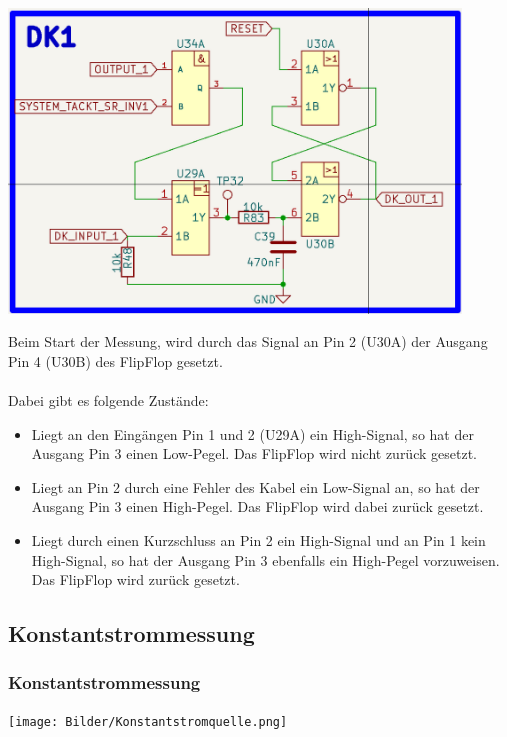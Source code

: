 \documentclass[a4paper,11pt]{scrartcl}
\begin{document}
\begin{center}
\includegraphics[width=12cm]{Bilder/Durchgangsprüfung.png}
\end{center}

Beim Start der Messung, wird durch das Signal an Pin 2 (U30A) der Ausgang Pin 4 (U30B) des FlipFlop gesetzt. 
\\
\\
Dabei gibt es folgende Zustände:

\begin{itemize}
	\item{Liegt an den Eingängen Pin 1 und 2 (U29A) ein High-Signal,  so hat der Ausgang Pin 3 einen Low-Pegel. Das FlipFlop wird nicht zurück gesetzt.}
	
	\item{Liegt an Pin 2 durch eine Fehler des Kabel ein Low-Signal an, so hat der Ausgang Pin 3 einen High-Pegel. Das FlipFlop wird dabei zurück gesetzt.}
	
	\item{Liegt durch einen Kurzschluss an Pin 2 ein High-Signal und an Pin 1 kein High-Signal, so hat der Ausgang Pin 3 ebenfalls ein High-Pegel vorzuweisen. Das FlipFlop wird zurück gesetzt.}
\end{itemize}

\newpage
\subsection{Konstantstrommessung}

\subsubsection{Konstantstrommessung}
\begin{center}
\texttt{[image: Bilder/Konstantstromquelle.png]}
\end{center}
\end{document}
